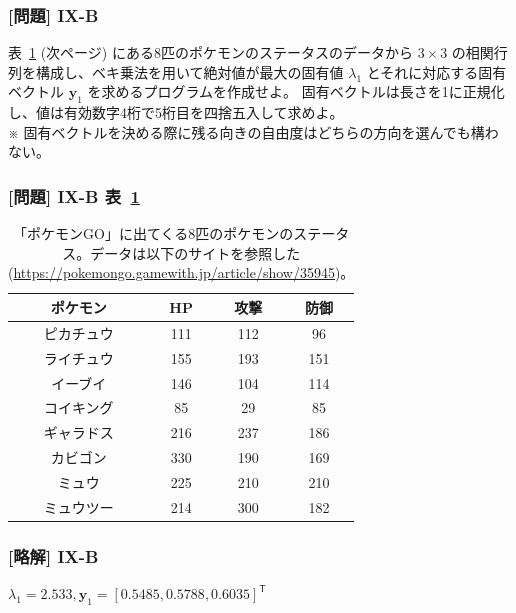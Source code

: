 \documentclass[dvipdfmx,aspectratio=169,20pt]{beamer}
\newcommand{\myfontsetting}[3]{{\fontsize{#1}{#2}\selectfont #3}}
\begin{document}
\graphicspath{{figs/}}

\begin{frame}
\frametitle{[問題] I\hspace{-.1em}X-B}

\myfontsetting{18pt}{18pt}{
表~\ref{table:pokemon_go}
\myfontsetting{12pt}{12pt}{(次ページ)}
にある8匹のポケモンのステータスのデータから $3\times 3$ の相関行列を構成し、ベキ乗法を用いて絶対値が最大の固有値 $\lambda_1$ とそれに対応する固有ベクトル $\bm{y}_1$ を求めるプログラムを作成せよ。
固有ベクトルは長さを1に正規化し、値は有効数字4桁で5桁目を四捨五入して求めよ。%
}\\
\myfontsetting{10pt}{10pt}{
※ 固有ベクトルを決める際に残る向きの自由度はどちらの方向を選んでも構わない。
}
\end{frame}
\begin{frame}
\frametitle{[問題] I\hspace{-.1em}X-B 表~\ref{table:pokemon_go}}

\myfontsetting{12pt}{12pt}{
\begin{table}[htbp]
    \centering
\begin{tabular}{|c||c|c|c|}
\hline
ポケモン & HP & 攻撃 & 防御\\
\hline
ピカチュウ  & 111 & 112 & 96\\
ライチュウ  & 155 & 193 & 151\\
イーブイ	& 146 & 104 & 114\\
コイキング	& 85 & 29 & 85\\
ギャラドス	& 216& 237 & 186\\
カビゴン	& 330 & 190 & 169\\
ミュウ	    & 225 &210 & 210\\
ミュウツー	& 214 & 300 & 182\\
\hline
\end{tabular}
\caption{
\myfontsetting{10pt}{10pt}{
「ポケモンGO」に出てくる8匹のポケモンのステータス。データは以下のサイトを参照した (\url{https://pokemongo.gamewith.jp/article/show/35945})。\label{table:pokemon_go}}
}
\end{table}
}
\end{frame}
\begin{frame}
\frametitle{[略解] I\hspace{-.1em}X-B}

$\lambda_1 = 2.533,\bm{y}_1 = [ 0.5485, 0.5788, 0.6035]^\mathsf{T}$

\end{frame}
\end{document}
